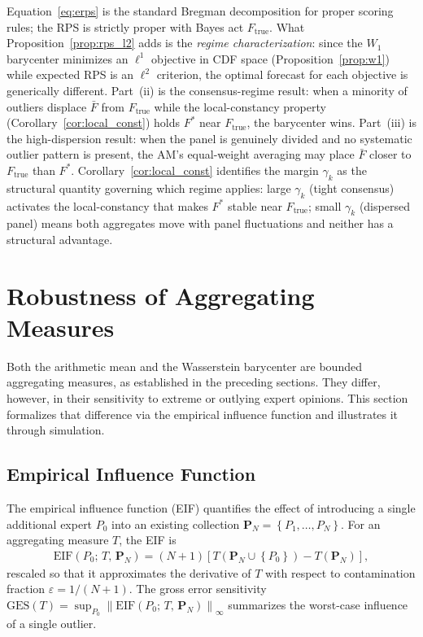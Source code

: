 \begin{remark}
Equation~\eqref{eq:erps} is the standard Bregman decomposition for proper scoring rules; the RPS is strictly proper with Bayes act $F_{\mathrm{true}}$.  What Proposition~\ref{prop:rps_l2} adds is the \emph{regime characterization}: since the $W_1$ barycenter minimizes an $\ell^1$ objective in CDF space (Proposition~\ref{prop:w1}) while expected RPS is an $\ell^2$ criterion, the optimal forecast for each objective is generically different.  Part~(ii) is the consensus-regime result: when a minority of outliers displace $\bar{F}$ from $F_{\mathrm{true}}$ while the local-constancy property (Corollary~\ref{cor:local_const}) holds $F^*$ near $F_{\mathrm{true}}$, the barycenter wins.  Part~(iii) is the high-dispersion result: when the panel is genuinely divided and no systematic outlier pattern is present, the AM's equal-weight averaging may place $\bar{F}$ closer to $F_{\mathrm{true}}$ than $F^*$.  Corollary~\ref{cor:local_const} identifies the margin $\gamma_k$ as the structural quantity governing which regime applies: large $\gamma_k$ (tight consensus) activates the local-constancy that makes $F^*$ stable near $F_{\mathrm{true}}$; small $\gamma_k$ (dispersed panel) means both aggregates move with panel fluctuations and neither has a structural advantage.
\end{remark}

\section{Robustness of Aggregating Measures}
\label{sec:robustness}

Both the arithmetic mean and the Wasserstein barycenter are bounded aggregating measures, as established in the preceding sections.  They differ, however, in their sensitivity to extreme or outlying expert opinions.  This section formalizes that difference via the empirical influence function and illustrates it through simulation.

\subsection{Empirical Influence Function}

The empirical influence function (EIF) quantifies the effect of introducing a single additional expert $P_0$ into an existing collection $\mathbf{P}_N = \left\{P_1,\ldots,P_N\right\}$.  For an aggregating measure $T$, the EIF is
\begin{align*}
\mathrm{EIF}(P_0;\, T,\, \mathbf{P}_N) = (N+1)\left[T\!\left(\mathbf{P}_N \cup \left\{P_0\right\}\right) - T\!\left(\mathbf{P}_N\right)\right],
\end{align*}
rescaled so that it approximates the derivative of $T$ with respect to contamination fraction $\varepsilon = 1/(N+1)$.  The gross error sensitivity $\mathrm{GES}(T) = \sup_{P_0} \left\|\mathrm{EIF}(P_0;\,T,\,\mathbf{P}_N)\right\|_\infty$ summarizes the worst-case influence of a single outlier.


